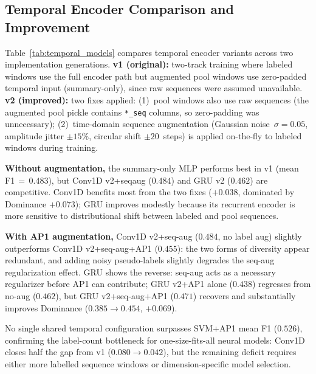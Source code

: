 \documentclass[sigconf,review,anonymous]{acmart}
\begin{document}
\subsection{Temporal Encoder Comparison and Improvement}
\label{sec:temporal_results}

Table~\ref{tab:temporal_models} compares temporal encoder variants across two
implementation generations.
\textbf{v1 (original):} two-track training where labeled windows use the full
encoder path but augmented pool windows use zero-padded temporal input
(summary-only), since raw sequences were assumed unavailable.
\textbf{v2 (improved):} two fixes applied: (1)~pool windows also use raw
sequences (the augmented pool pickle contains \texttt{*\_seq} columns, so
zero-padding was unnecessary); (2)~time-domain sequence augmentation (Gaussian
noise~$\sigma{=}0.05$, amplitude jitter ${\pm}15\%$, circular shift
${\pm}20$~steps) is applied on-the-fly to labeled windows during training.

\textbf{Without augmentation,} the summary-only MLP performs best in v1
(mean F1\,$=$\,$0.483$), but Conv1D v2+seqaug ($0.484$) and GRU v2 ($0.462$)
are competitive.
Conv1D benefits most from the two fixes ($+0.038$, dominated by Dominance
$+0.073$); GRU improves modestly because its recurrent encoder is more
sensitive to distributional shift between labeled and pool sequences.

\textbf{With AP1 augmentation,}
Conv1D v2+seq-aug ($0.484$, no label aug) slightly outperforms
Conv1D v2+seq-aug+AP1 ($0.455$): the two forms of diversity appear
redundant, and adding noisy pseudo-labels slightly degrades the
seq-aug regularization effect.
GRU shows the reverse: seq-aug acts as a necessary regularizer
before AP1 can contribute; GRU v2+AP1 alone ($0.438$) regresses from
no-aug ($0.462$), but GRU v2+seq-aug+AP1 ($0.471$) recovers and
substantially improves Dominance ($0.385\rightarrow0.454$, $+0.069$).

No single shared temporal configuration surpasses SVM+AP1 mean F1 ($0.526$),
confirming the label-count bottleneck for one-size-fits-all neural models:
Conv1D closes half the gap from v1 ($0.080\rightarrow0.042$), but the
remaining deficit requires either more labelled sequence windows or
dimension-specific model selection.
\end{document}
